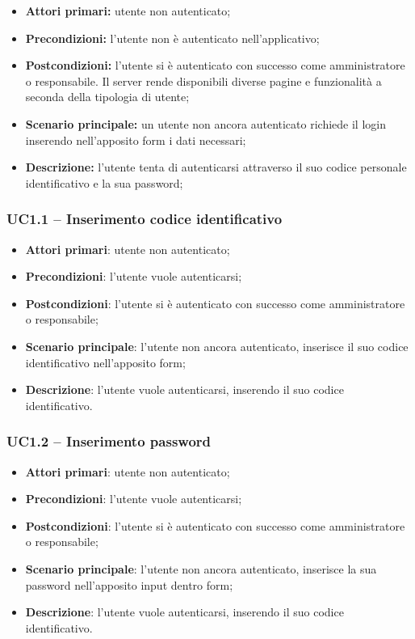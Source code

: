 \begin{itemize}
	\item 	\textbf{Attori primari:} utente non autenticato;
	\item 	\textbf{Precondizioni:} l'utente non è autenticato nell'applicativo;
	\item 	\textbf{Postcondizioni:}	l'utente si è autenticato con successo come amministratore o responsabile. Il server rende disponibili diverse pagine e funzionalità a seconda della tipologia di utente;
	\item 	\textbf{Scenario principale:} un utente non ancora autenticato richiede il login inserendo nell'apposito form i dati necessari;
	\item 	\textbf{Descrizione:} l'utente tenta di autenticarsi attraverso il suo codice personale identificativo e la sua password;
\end{itemize}

\subsubsection{UC1.1 – Inserimento codice identificativo}
\begin{itemize}
	\item \textbf{Attori primari}: utente non autenticato;
\item \textbf{Precondizioni}: l'utente vuole autenticarsi;
\item \textbf{Postcondizioni}: l'utente si è autenticato con successo come amministratore o responsabile;
\item \textbf{Scenario principale}: l'utente non ancora autenticato, inserisce il suo codice identificativo nell'apposito form;
\item \textbf{Descrizione}: l'utente vuole autenticarsi, inserendo il suo codice identificativo.
\end{itemize}

\subsubsection{UC1.2 – Inserimento password}
\begin{itemize}
\item \textbf{Attori primari}: utente non autenticato;
\item \textbf{Precondizioni}: l'utente vuole autenticarsi;
\item \textbf{Postcondizioni}: l'utente si è autenticato con successo come amministratore o responsabile;
\item \textbf{Scenario principale}: l'utente non ancora autenticato, inserisce la sua password nell'apposito input dentro form;
\item \textbf{Descrizione}: l'utente vuole autenticarsi, inserendo il suo codice identificativo.
\end{itemize}

